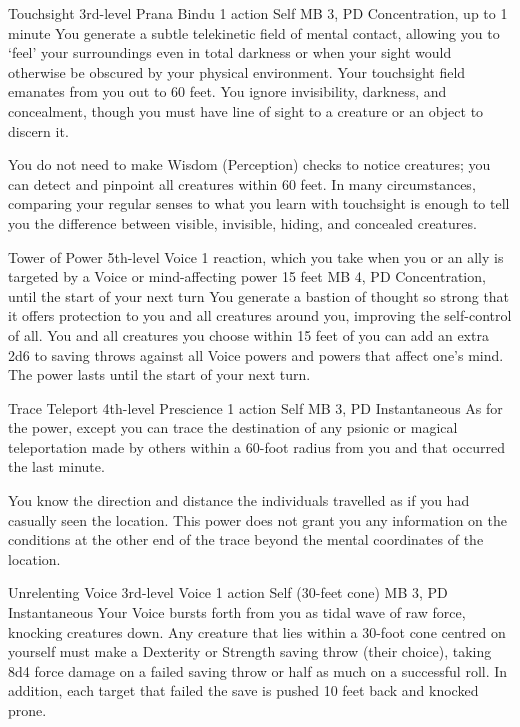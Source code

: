 \DndPowerHeader%
  {Touchsight}
  {3rd-level Prana Bindu}
  {1 action}
  {Self}
  {MB 3, PD \lvlthree}
  {Concentration, up to 1 minute}
  You generate a subtle telekinetic field of mental contact,
  allowing you to `feel' your surroundings even in total darkness
  or when your sight would otherwise be obscured
  by your physical environment.
  Your touchsight field emanates from you out to 60 feet.
  You ignore invisibility, darkness, and concealment,
  though you must have line of sight to a creature or an object
  to discern it.
  
  You do not need to make Wisdom (Perception) checks
  to notice creatures; you can detect and pinpoint all creatures
  within 60 feet.
  In many circumstances, comparing your regular senses
  to what you learn with touchsight is enough to tell you
  the difference between visible, invisible, hiding,
  and concealed creatures.

\DndPowerHeader%
  {Tower of Power}
  {5th-level Voice}
  {1 reaction, which you take when you or an ally is
    targeted by a Voice or mind-affecting power}
  {15 feet}
  {MB 4, PD \lvlfive}
  {Concentration, until the start of your next turn}
  You generate a bastion of thought so strong
  that it offers protection to you and all creatures around you,
  improving the self-control of all.
  You and all creatures you choose within 15 feet of you
  can add an extra 2d6 to saving throws against all Voice powers
  and powers that affect one's mind.
  The power lasts until the start of your next turn.

\DndPowerHeader%
  {Trace Teleport}
  {4th-level Prescience}
  {1 action}
  {Self}
  {MB 3, PD \lvlfour}
  {Instantaneous}
  As for the  power,
  except you can trace the destination of any psionic
  or magical teleportation made by others within
  a 60-foot radius from you
  and that occurred the last minute.

  You know the direction and distance the individuals travelled
  as if you had casually seen the location.
  This power does not grant you any information on the conditions
  at the other end of the trace
  beyond the mental coordinates of the location.

\DndPowerHeader%
  {Unrelenting Voice}
  {3rd-level Voice}
  {1 action}
  {Self (30-feet cone)}
  {MB 3, PD \lvlthree}
  {Instantaneous}
Your Voice bursts forth from you as tidal wave of raw force,
knocking creatures down.
Any creature that lies within a 30-foot cone centred on yourself
must make a Dexterity or Strength saving throw (their choice),
taking 8d4 force damage on a failed saving throw or half as much on
a successful roll.
In addition, each target that failed the save is pushed 10 feet back
and knocked prone.

